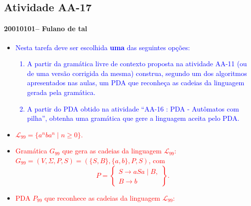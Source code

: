 \documentclass[12pt]{article}
\def\discente{Fulano de tal}
\def\matricula{20010101}
\def\aa{17}
\def\myling{{99}} %
\begin{document}
\subsection*{Atividade AA-\aa}
 \paragraph{\matricula -- \discente}
 \begin{itemize}
% 
  \item \textcolor{blue}{Nesta tarefa deve ser escolhida \textbf{uma} das seguintes opções:
   \begin{enumerate}
    \item A partir da gramática livre de contexto proposta na atividade AA-11 (ou de uma versão corrigida da mesma) construa, segundo um dos algoritmos apresentados nas aulas, um PDA que reconheça as cadeias da linguagem gerada pela gramática.
    \item A partir do PDA obtido na atividade ``AA-16 : PDA - Autômatos com pilha'', obtenha uma gramática que gere a linguagem aceita pelo PDA.
   \end{enumerate}}
  \item \textcolor{red}{$\mathcal{L}_{\myling} = \{a^nba^n \mid n \geqslant 0\}$.}
  \item  \textcolor{red}{Gramática $G_{\myling}$ que gera as cadeias da linguagem $\mathcal{L}_{\myling}$:\\ $G_{\myling}=(V,\Sigma,P,S)=(\{S,B\},\{a,b\},P,S)$, com
  $$
   P =
   \left\{\begin{array}{l}
    S \to aSa \mid B,\\
    B \to b
   \end{array}\right\}.
  $$
  }
  \item \textcolor{red}{PDA $P_{\myling}$ que reconhece as cadeias da linguagem $\mathcal{L}_{\myling}$:}
\begin{center}
\end{center}
\end{itemize}
\end{document}

